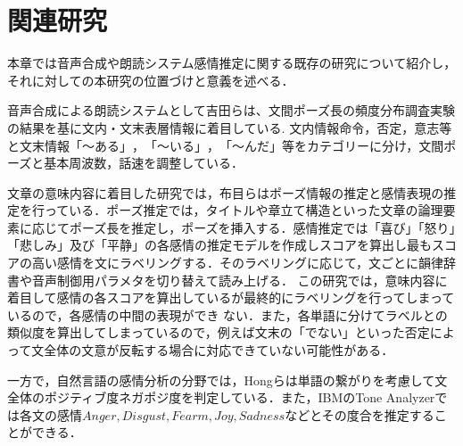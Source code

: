 \chapter{関連研究}
本章では音声合成や朗読システム感情推定に関する既存の研究について紹介し，それに対しての本研究の位置づけと意義を述べる．

音声合成による朗読システムとして吉田ら\cite{yoshida}は、文間ポーズ長の頻度分布調査実験の結果を基に文内・文末表層情報に着目している.
文内情報\(命令，否定，意志等\)と文末情報\(「〜ある」，「〜いる」，「〜んだ」等\)をカテゴリーに分け，文間ポーズと基本周波数，話速を調整している．

文章の意味内容に着目した研究では，布目ら\cite{fume}はポーズ情報の推定と感情表現の推定を行っている．ポーズ推定では，タイトルや章立て構造といった文章の論理要素に応じてポーズ長を推定し，ポーズを挿入する．感情推定では「喜び」「怒り」「悲しみ」及び「平静」の各感情の推定モデルを作成しスコアを算出し最もスコアの高い感情を文にラベリングする．そのラベリングに応じて，文ごとに韻律辞書や音声制御用パラメタを切り替えて読み上げる．
この研究では，意味内容に着目して感情の各スコアを算出しているが最終的にラベリングを行ってしまっているので，各感情の中間の表現ができ
ない．また，各単語に分けてラベルとの類似度を算出してしまっているので，例えば文末の「でない」といった否定によって文全体の文意が反転する場合に対応できていない可能性がある．

一方で，自然言語の感情分析の分野では，Hongら\cite{hong}は単語の繋がりを考慮して文全体のポジティブ度ネガポジ度を判定している．また，IBMのTone Analyzerでは各文の感情\(Anger, Disgust, Fearm, Joy, Sadnessなど\)とその度合を推定することができる．
